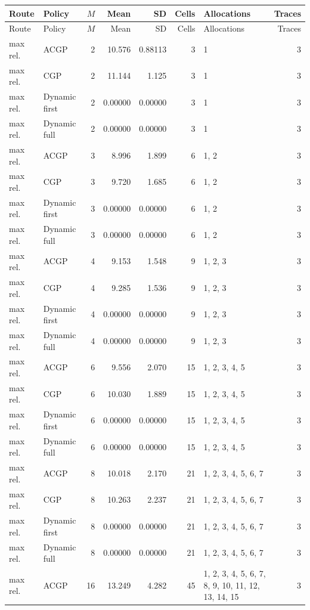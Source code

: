\documentclass[10pt,a4paper]{article}
\begin{document}
\tiny\setlength{\tabcolsep}{2pt}\begin{longtable}{@{}p{23mm}p{29mm}rrrrp{36mm}r@{}}
\toprule Route & Policy & $M$ & Mean & SD & Cells & Allocations & Traces \\ \midrule\endfirsthead
\toprule Route & Policy & $M$ & Mean & SD & Cells & Allocations & Traces \\ \midrule\endhead
\bottomrule\endfoot
max rel. & ACGP & 2 & 10.576 & 0.88113 & 3 & 1 & 3 \\
max rel. & CGP & 2 & 11.144 & 1.125 & 3 & 1 & 3 \\
max rel. & Dynamic first & 2 & 0.00000 & 0.00000 & 3 & 1 & 3 \\
max rel. & Dynamic full & 2 & 0.00000 & 0.00000 & 3 & 1 & 3 \\
max rel. & ACGP & 3 & 8.996 & 1.899 & 6 & 1, 2 & 3 \\
max rel. & CGP & 3 & 9.720 & 1.685 & 6 & 1, 2 & 3 \\
max rel. & Dynamic first & 3 & 0.00000 & 0.00000 & 6 & 1, 2 & 3 \\
max rel. & Dynamic full & 3 & 0.00000 & 0.00000 & 6 & 1, 2 & 3 \\
max rel. & ACGP & 4 & 9.153 & 1.548 & 9 & 1, 2, 3 & 3 \\
max rel. & CGP & 4 & 9.285 & 1.536 & 9 & 1, 2, 3 & 3 \\
max rel. & Dynamic first & 4 & 0.00000 & 0.00000 & 9 & 1, 2, 3 & 3 \\
max rel. & Dynamic full & 4 & 0.00000 & 0.00000 & 9 & 1, 2, 3 & 3 \\
max rel. & ACGP & 6 & 9.556 & 2.070 & 15 & 1, 2, 3, 4, 5 & 3 \\
max rel. & CGP & 6 & 10.030 & 1.889 & 15 & 1, 2, 3, 4, 5 & 3 \\
max rel. & Dynamic first & 6 & 0.00000 & 0.00000 & 15 & 1, 2, 3, 4, 5 & 3 \\
max rel. & Dynamic full & 6 & 0.00000 & 0.00000 & 15 & 1, 2, 3, 4, 5 & 3 \\
max rel. & ACGP & 8 & 10.018 & 2.170 & 21 & 1, 2, 3, 4, 5, 6, 7 & 3 \\
max rel. & CGP & 8 & 10.263 & 2.237 & 21 & 1, 2, 3, 4, 5, 6, 7 & 3 \\
max rel. & Dynamic first & 8 & 0.00000 & 0.00000 & 21 & 1, 2, 3, 4, 5, 6, 7 & 3 \\
max rel. & Dynamic full & 8 & 0.00000 & 0.00000 & 21 & 1, 2, 3, 4, 5, 6, 7 & 3 \\
max rel. & ACGP & 16 & 13.249 & 4.282 & 45 & 1, 2, 3, 4, 5, 6, 7, 8, 9, 10, 11, 12, 13, 14, 15 & 3 \\

\end{longtable}
\end{document}
